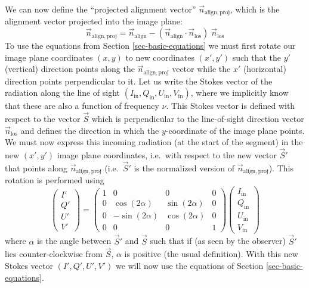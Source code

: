 \documentclass{report}
\begin{document}
We can now define the ``projected alignment vector'' $\vec
n_{\mathrm{align,proj}}$, which is the alignment vector projected into
the image plane:
\begin{equation}
\vec n_{\mathrm{align,proj}} = \vec n_{\mathrm{align}} - (\vec n_{\mathrm{align}}\cdot 
\vec n_{\mathrm{los}})\;\vec n_{\mathrm{los}}
\end{equation}
To use the equations from Section \ref{sec-basic-equations} we must first
rotate our image plane coordinates $(x,y)$ to new coordinates $(x',y')$ such
that the $y'$ (vertical) direction points along the $\vec
n_{\mathrm{align,proj}}$ vector while the $x'$ (horizontal) direction points
perpendicular to it. Let us write the Stokes vector of the radiation along
the line of sight
$(I_{\mathrm{in}},Q_{\mathrm{in}},U_{\mathrm{in}},V_{\mathrm{in}})$, where
we implicitly know that these are also a function of frequency $\nu$. This
Stokes vector is defined with respect to the vector $\vec S$ which is
perpendicular to the line-of-sight direction vector $\vec n_{\mathrm{los}}$
and defines the direction in which the $y$-coordinate of the image plane
points. We must now express this incoming radiation (at the start of the
segment) in the new $(x',y')$ image plane coordinates, i.e.~with respect to
the new vector $\vec S'$ that points along $\vec n_{\mathrm{align,proj}}$
(i.e.~$\vec S'$ is the normalized version of $\vec
n_{\mathrm{align,proj}}$). This rotation is performed using
\begin{equation}\label{eq-rot-stokes-align}
\left(\begin{matrix}
I'\\Q'\\U'\\V'
\end{matrix}\right)
=
\left(\begin{matrix}
1 & 0 & 0 & 0 \\
0 & \cos(2\alpha) & \sin(2\alpha) & 0 \\
0 & -\sin(2\alpha) & \cos(2\alpha) & 0 \\
0 & 0 & 0 & 1
\end{matrix}\right)
\left(\begin{matrix}
I_{\mathrm{in}}\\Q_{\mathrm{in}}\\U_{\mathrm{in}}\\V_{\mathrm{in}}
\end{matrix}\right)
\end{equation}
where $\alpha$ is the angle between $\vec S'$ and $\vec S$ such that if (as
seen by the observer) $\vec S'$ lies counter-clockwise from $\vec S$,
$\alpha$ is positive (the usual definition). With this new Stokes vector
$(I',Q',U',V')$ we will now use the equations of Section
\ref{sec-basic-equations}. 
\end{document}
